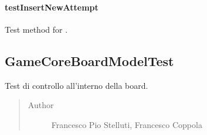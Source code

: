 \documentclass[letterpaper,10pt,italian,openany,oneside]{sphinxmanual}
\begin{document}
\paragraph{testInsertNewAttempt}
\label{\detokenize{test/it/unicam/cs/pa/mastermind/test/GameCoreBoardControllerTest:testinsertnewattempt}}

\begin{fulllineitems}
\label{\detokenize{test/it/unicam/cs/pa/mastermind/test/GameCoreBoardControllerTest:it.unicam.cs.pa.mastermind.test.GameCoreBoardControllerTest.testInsertNewAttempt()}}
Test method for .

\end{fulllineitems}



\subsection{GameCoreBoardModelTest}
\label{\detokenize{test/it/unicam/cs/pa/mastermind/test/GameCoreBoardModelTest:gamecoreboardmodeltest}}\label{\detokenize{test/it/unicam/cs/pa/mastermind/test/GameCoreBoardModelTest::doc}}

\begin{fulllineitems}
\label{\detokenize{test/it/unicam/cs/pa/mastermind/test/GameCoreBoardModelTest:it.unicam.cs.pa.mastermind.test.GameCoreBoardModelTest}}
Test di controllo all’interno della board.
\begin{quote}\begin{description}
\item[{Author}] \leavevmode
Francesco Pio Stelluti, Francesco Coppola

\end{description}\end{quote}

\end{fulllineitems}
\end{document}
